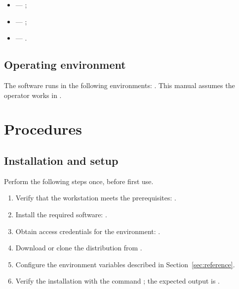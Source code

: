 \documentclass[12pt,a4paper]{extarticle}
\begin{document}
\begin{itemize}[leftmargin=1.25cm]
    \item \textbf{} --- ;
    \item \textbf{} --- ;
    \item \textbf{} --- .
\end{itemize}

\subsection{Operating environment}
The software runs in the following environments: . This manual assumes the operator works in .

\section{Procedures}\label{sec:procedures}

\subsection{Installation and setup}
Perform the following steps once, before first use.

\begin{enumerate}[label=\arabic*., leftmargin=1.25cm]
    \item Verify that the workstation meets the prerequisites: .
    \item Install the required software: .
    \item Obtain access credentials for the environment: .
    \item Download or clone the distribution from .
    \item Configure the environment variables described in Section~\ref{sec:reference}.
    \item Verify the installation with the command \texttt{}; the expected output is .
\end{enumerate}
\end{document}
